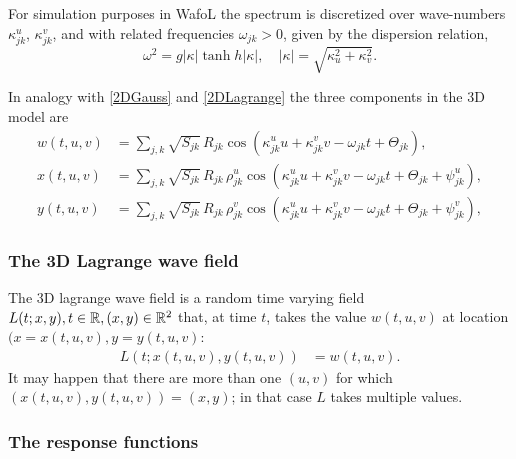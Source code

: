 For simulation purposes in {\sc Wafo}L the spectrum is discretized over wave-numbers $\kappa^u_{jk}$, $\kappa^v_{jk}$, and with related frequencies
$\omega_{jk} > 0$, given by the dispersion relation,
$$
\omega^2 = g |\kappa| \tanh h |\kappa|, \quad |\kappa| = \sqrt{\kappa_u^2 + \kappa_v^2}.
$$

In analogy with \eqref{2DGauss} and \eqref{2DLagrange} the three components in the 3D model are
\begin{align}
w(t,u,v) &=
\sum_{j,k} \sqrt{S_{jk}}\, R_{jk} \cos (\kappa^u_{jk} u + \kappa^v_{jk} v - \omega _{jk} t
+ \Theta _{jk}), \label{3DGauss} \\
x(t,u,v) &=
\sum_{j,k} \sqrt{S_{jk}}\, R_{jk} \, \rho^u_{jk} \cos (\kappa^u_{jk} u + \kappa^v_{jk} v - \omega _{jk} t
+ \Theta _{jk} + \psi ^u_{jk}),
\label{3DX} \\
y(t,u,v) &=
\sum_{j,k} \sqrt{S_{jk}}\, R_{jk} \, \rho^v_{jk} \cos (\kappa^u_{jk} u + \kappa^v_{jk} v - \omega _{jk} t
+ \Theta _{jk} + \psi ^v_{jk}),
\label{3DY}
\end{align}
\subsubsection*{The 3D Lagrange wave field}
The 3D lagrange wave field is a random time varying field $L(t; x, y), t \in \mathbb R, (x,y) \in \mathbb R^2$ that, at time $t$, takes the value $w(t,u,v)$ at location $(x=x(t,u,v), y=y(t,u,v)$:
\begin{align}
L(t; x(t,u,v), y(t,u,v)) &= w(t,u,v). \label{L}
\end{align}
It may happen that there are more than one $(u,v)$ for which $(x(t,u,v), y(t,u,v) ) =(x,y)$; in that case $L$ takes multiple values.

\subsubsection*{The response functions}

